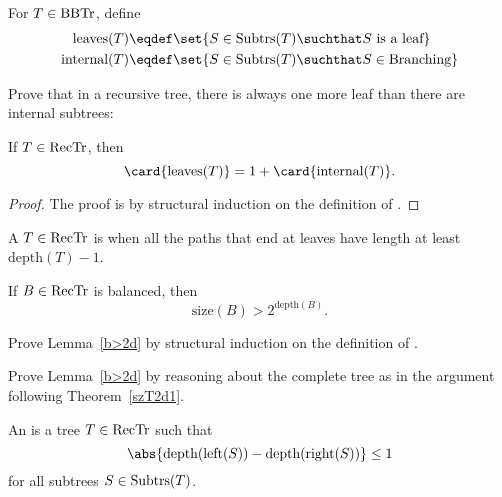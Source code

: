 \begin{problem}
For $T \in \text{BBTr}$, define
\begin{align*}
\text{leaves}(T)   & \eqdef \set{S \in \subbrn{T} \suchthat S\ \text{is a leaf}}\\
\text{internal}(T) & \eqdef \set{S \in \subbrn{T} \suchthat S \in \brnchng}
\end{align*}

Prove that in a recursive tree, there is always one more leaf than
there are internal subtrees:

\begin{lemma*}
If $T \in \text{RecTr}$, then
\[
\card{\text{leaves}(T)} = 1 + \card{\text{internal}(T)}.
\]
\end{lemma*}
\begin{solution}

\begin{proof}
The proof is by structural induction on the definition of \rectr.

\end{proof} 
\end{solution}
\end{problem}

A $T \in \text{RecTr}$ is  when all the paths that end at
leaves have length at least $\text{depth}(T) - 1$.

\begin{lemma}\label{b>2d}
If $B \in \text{RecTr}$ is balanced, then
\[
\text{size}(B) > 2^{\text{depth}(B)}.
\]
\end{lemma}

\begin{problem}
Prove Lemma~\ref{b>2d} by structural induction on the definition of \rectr.

\begin{solution}
\end{solution}
\end{problem}

\begin{problem}
Prove Lemma~\ref{b>2d} by reasoning about the complete tree as in the
argument following Theorem~\ref{szT2d1}.

\begin{solution}
\end{solution}
\end{problem}

An  is a tree $T\in \text{RecTr}$ such that
\[
\abs{\text{depth}(\leftsub{(S)}) - \text{depth}(\rightsub{(S)})} \leq 1
\]
for all subtrees $S \in \text{Subtrs}(T)$.

